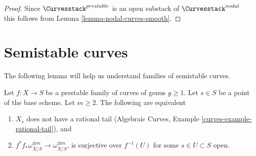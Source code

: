 \begin{proof}
Since $\Curvesstack^{prestable}$ is an open substack of
$\Curvesstack^{nodal}$ this follows from
Lemma \ref{lemma-nodal-curves-smooth}.
\end{proof}




\section{Semistable curves}
\label{section-semistable-curves}

\noindent
The following lemma will help us understand families of semistable curves.

\begin{lemma}
\label{lemma-semistable}
Let $f : X \to S$ be a prestable family of curves of genus $g \geq 1$.
Let $s \in S$ be a point of the base scheme. Let $m \geq 2$.
The following are equivalent
\begin{enumerate}
\item $X_s$ does not have a rational tail
(Algebraic Curves, Example \ref{curves-example-rational-tail}), and
\item $f^*f_*\omega_{X/S}^{\otimes m} \to \omega_{X/S}^{\otimes m}$,
is surjective over $f^{-1}(U)$ for some $s \in U \subset S$ open.
\end{enumerate}
\end{lemma}

